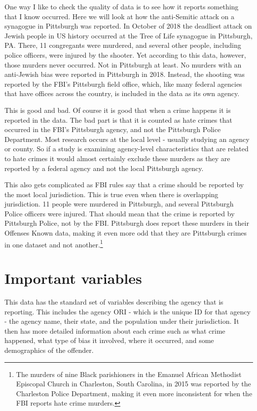 \documentclass[
]{krantz}
\begin{document}
One way I like to check the quality of data is to see how it
reports something that I know occurred. Here we will look at
how the anti-Semitic attack on a synagogue in Pittsburgh was
reported. In October of 2018 the deadliest attack on Jewish
people in US history occurred at the Tree of Life synagogue
in Pittsburgh, PA. There, 11 congregants were murdered, and
several other people, including police officers, were
injured by the shooter. Yet according to this data, however,
those murders never occurred. Not in Pittsburgh at least. No
murders with an anti-Jewish bias were reported in Pittsburgh
in 2018. Instead, the shooting was reported by the FBI's
Pittsburgh field office, which, like many federal agencies
that have offices across the country, is included in the
data as its own agency.

This is good and bad. Of course it is good that when a crime
happens it is reported in the data. The bad part is that it
is counted as hate crimes that occurred in the FBI's
Pittsburgh agency, and not the Pittsburgh Police Department.
Most research occurs at the local level - usually studying
an agency or county. So if a study is examining agency-level
characteristics that are related to hate crimes it would
almost certainly exclude these murders as they are reported
by a federal agency and not the local Pittsburgh agency.

This also gets complicated as FBI rules say that a crime
should be reported by the most local jurisdiction. This is
true even when there is overlapping jurisdiction. 11 people
were murdered in Pittsburgh, and several Pittsburgh Police
officers were injured. That should mean that the crime is
reported by Pittsburgh Police, not by the FBI. Pittsburgh
does report these murders in their Offenses Known data,
making it even more odd that they are Pittsburgh crimes in
one dataset and not another.\footnote{The murders of nine
  Black parishioners in the Emanuel African Methodist
  Episcopal Church in Charleston, South Carolina, in 2015
  was reported by the Charleston Police Department, making
  it even more inconsistent for when the FBI reports hate
  crime murders.}

\section{Important variables}\label{important-variables-6}

This data has the standard set of variables describing the
agency that is reporting. This includes the agency ORI -
which is the unique ID for that agency - the agency name,
their state, and the population under their jurisdiction. It
then has more detailed information about each crime such as
what crime happened, what type of bias it involved, where it
occurred, and some demographics of the offender.
\end{document}
